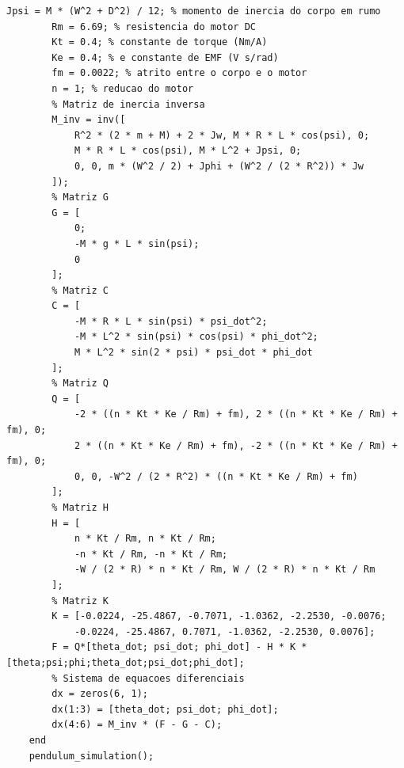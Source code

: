 \documentclass[10pt]{article}
\begin{document}
\begin{appendices}
\begin{lstlisting}[caption={Código da simulação do sistema com ode45}, label=lst:pendulum_sim_r]
        Jpsi = M * (W^2 + D^2) / 12; % momento de inercia do corpo em rumo
        Rm = 6.69; % resistencia do motor DC
        Kt = 0.4; % constante de torque (Nm/A)
        Ke = 0.4; % e constante de EMF (V s/rad)
        fm = 0.0022; % atrito entre o corpo e o motor
        n = 1; % reducao do motor
        % Matriz de inercia inversa
        M_inv = inv([
            R^2 * (2 * m + M) + 2 * Jw, M * R * L * cos(psi), 0;
            M * R * L * cos(psi), M * L^2 + Jpsi, 0;
            0, 0, m * (W^2 / 2) + Jphi + (W^2 / (2 * R^2)) * Jw
        ]);
        % Matriz G
        G = [
            0;
            -M * g * L * sin(psi);
            0
        ];
        % Matriz C
        C = [
            -M * R * L * sin(psi) * psi_dot^2;
            -M * L^2 * sin(psi) * cos(psi) * phi_dot^2;
            M * L^2 * sin(2 * psi) * psi_dot * phi_dot
        ];
        % Matriz Q
        Q = [
            -2 * ((n * Kt * Ke / Rm) + fm), 2 * ((n * Kt * Ke / Rm) + fm), 0;
            2 * ((n * Kt * Ke / Rm) + fm), -2 * ((n * Kt * Ke / Rm) + fm), 0;
            0, 0, -W^2 / (2 * R^2) * ((n * Kt * Ke / Rm) + fm)
        ];
        % Matriz H
        H = [
            n * Kt / Rm, n * Kt / Rm;
            -n * Kt / Rm, -n * Kt / Rm;
            -W / (2 * R) * n * Kt / Rm, W / (2 * R) * n * Kt / Rm
        ];
        % Matriz K
        K = [-0.0224, -25.4867, -0.7071, -1.0362, -2.2530, -0.0076;
            -0.0224, -25.4867, 0.7071, -1.0362, -2.2530, 0.0076];
        F = Q*[theta_dot; psi_dot; phi_dot] - H * K * [theta;psi;phi;theta_dot;psi_dot;phi_dot];
        % Sistema de equacoes diferenciais
        dx = zeros(6, 1);
        dx(1:3) = [theta_dot; psi_dot; phi_dot];
        dx(4:6) = M_inv * (F - G - C);
    end
    pendulum_simulation();
\end{lstlisting}

\end{appendices}
\end{document}
